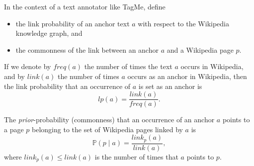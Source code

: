 \exercise

In the context of a text annotator like TagMe, define
%
\begin{itemize}
  \item the link probability of an anchor text $a$ with respect to the Wikipedia
    knowledge graph, and
  \item the commonness of the link between an anchor $a$ and a Wikipedia page
    $p$.
\end{itemize}

\solution

If we denote by $freq(a)$ the number of times the text $a$ occurs in Wikipedia,
and by $link(a)$ the number of times $a$ occurs as an anchor in Wikipedia, then
the link probability that an occurrence of $a$ is set as an anchor is
%
$$lp(a)=\frac{link(a)}{freq(a)}.$$

The \emph{prior}-probability (commonness) that an occurrence of an anchor $a$
points to a page $p$ belonging to the set of Wikipedia pages linked by $a$ is
%
$$\mathbb{P}(p \mid a)=\frac{link_p(a)}{link(a)},$$
%
where $link_p(a) \leq link(a)$ is the number of times that $a$ points to
$p$.